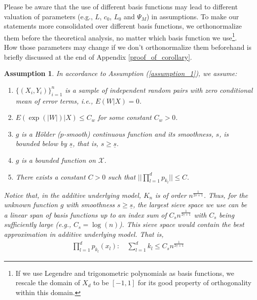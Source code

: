\documentclass[12pt, a4paper]{article}
\theoremstyle{MAstyle} \newtheorem{assumption}{Assumption}[section]
\theoremstyle{MAstyle} \newtheorem{definition}{Definition}[section]
\theoremstyle{MAstyle} \newtheorem{theorem}{Theorem}[section]
\theoremstyle{MAstyle} \newtheorem{corollary}{Corollary}[section]
\begin{document}
                    Please be aware that the use of different basis functions may lead to different valuation of parameters (e.g., $L$, $c_0$, $L_0$ and $\Psi_M$) in assumptions. To make our statements more consolidated over different basis functions, we orthonormalize them before the theoretical analysis, no matter which basis function we use\footnote{If we use Legendre and trigonometric polynomials as basis functions, we rescale the domain of $X_d$ to be $[-1,1]$ for its good property of orthogonality within this domain.}. How those parameters may change if we don't orthonormalize them beforehand is briefly discussed at the end of Appendix \ref{proof_of_corollary}.

                    \begin{assumption}\label{dae_assumption_1}
                        In accordance to Assumption (\ref{assumption_1}), we assume:
                        \begin{enumerate}[label=(\alph*), noitemsep]
                            \item $\{(X_i, Y_i)\}_{i=1}^n$ is a sample of independent random pairs with zero conditional mean of error terms, i.e., $E(W|X)=0$.
                            \item $E(\exp(|W|)|X)\le C_w$ for some constant $C_w>0$.
                            \item $g$ is a Hölder ($p$-smooth) continuous function and its smoothness, $s$, is bounded below by $\underline{s}$, that is, $s \ge \underline{s}$. 
                            \item $g$ is a bounded function on $\mathcal{X}$.
                            \item There exists a constant $C>0$ such that $||\prod_{l=1}^d p_{k_l}|| \le C$.
                        \end{enumerate}

                        Notice that, in the additive underlying model, $K_n$ is of order $n^{\frac{1}{2s+1}}$. Thus, for the unknown function $g$ with smoothness $s \ge \underline{s}$, the largest sieve space we use can be a linear span of basis functions up to an index sum of $C_sn^{\frac{1}{2\underline{s}+1}}$ with $C_s$ being sufficiently large (e.g., $C_s=\log(n)$). This sieve space would contain the best approximation in additive underlying model. That is,
                        \begin{align} \label{set_of_basis_function}
                            \prod_{l=1}^{d}p_{k_l}(x_l): \quad \sum_{l=1}^{d}k_l \le C_sn^{\frac{1}{2\underline{s}+1}}
                        \end{align}


\end{assumption}
\end{document}
